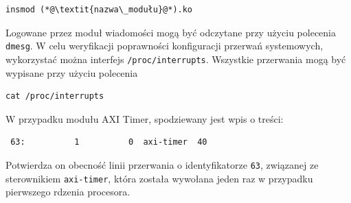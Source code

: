 \begin{lstlisting}
insmod (*@\textit{nazwa\_modułu}@*).ko
\end{lstlisting}

Logowane przez moduł wiadomości mogą być odczytane przy użyciu polecenia \texttt{dmesg}.
W celu weryfikacji poprawności konfiguracji przerwań systemowych, wykorzystać można interfejs \texttt{/proc/interrupts}.
Wszystkie przerwania mogą być wypisane przy użyciu polecenia

\begin{lstlisting}
cat /proc/interrupts
\end{lstlisting}

W przypadku modułu AXI Timer, spodziewany jest wpis o treści:
\begin{lstlisting}
 63:          1          0  axi-timer  40
\end{lstlisting}
Potwierdza on obecność linii przerwania o identyfikatorze \texttt{63}, związanej ze sterownikiem \texttt{axi-timer}, która została wywołana jeden raz w przypadku pierwszego rdzenia procesora.


